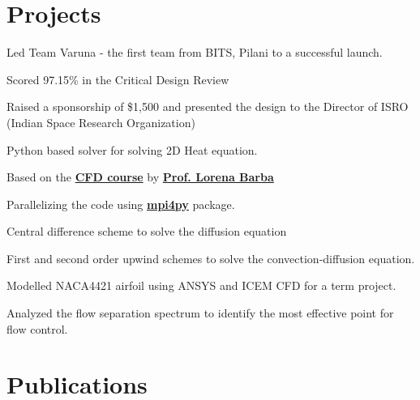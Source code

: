 \documentclass[]{resume}
\begin{document}
\begin{minipage}[t]{0.66\textwidth}
\section{Projects}
\begin{tightemize}
\item Led Team Varuna - the first team from BITS, Pilani to a successful launch.
\item Scored 97.15\% in the Critical Design Review
\item Raised a sponsorship of \$1,500 and presented the design to the Director of ISRO
(Indian Space Research Organization)
\end{tightemize}
\sectionsep

\begin{tightemize}
\item Python based solver for solving 2D Heat equation.
\item Based on the \textbf{\href{https://itunes.apple.com/us/itunes-u/computational-fluid-dynamics/id452560554?mt=10}
		{CFD course}} by \textbf{\href{http://lorenabarba.com}{Prof. Lorena Barba}}
\item Parallelizing the code using \textbf{\href{https://pypi.python.org/pypi/mpi4py}{mpi4py}} package.
\end{tightemize}
\begin{tightemize}
\item Central difference scheme to solve the diffusion equation
\item First and second order upwind schemes to solve the convection-diffusion equation.
\end{tightemize}
\begin{tightemize}
\item Modelled NACA4421 airfoil using ANSYS and ICEM CFD for a term project.
\item Analyzed the flow separation spectrum to identify the most effective point for flow control.
\end{tightemize}
\sectionsep


\section{Publications}
\renewcommand\refname{\vskip -1.5cm} %


\nocite{*}

\end{minipage}
\end{document}
